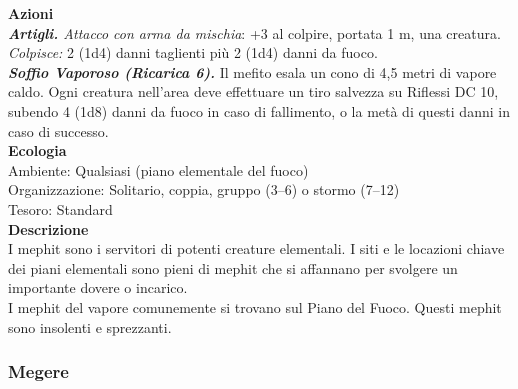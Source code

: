 \begin{multicols}{2}
\smallskip\textbf{Azioni}\\
\emph{\textbf{Artigli.} Attacco con arma da mischia}: +3 al colpire, portata 1 m, una creatura.\\
\emph{Colpisce:} 2 (1d4) danni taglienti più 2 (1d4) danni da fuoco.\\
\emph{\textbf{Soffio Vaporoso (Ricarica 6).}} Il mefito esala un cono di 4,5 metri di vapore caldo. Ogni creatura nell'area deve effettuare un tiro salvezza su Riflessi DC 10, subendo 4 (1d8) danni da fuoco in caso di fallimento, o la metà di questi danni in caso di successo.\\
\textbf{Ecologia}\\
Ambiente: Qualsiasi (piano elementale del fuoco)\\
Organizzazione: Solitario, coppia, gruppo (3–6) o stormo (7–12)\\
Tesoro: Standard\\
\textbf{Descrizione}\\
I mephit sono i servitori di potenti creature elementali. I siti e le locazioni chiave dei piani elementali sono pieni di mephit che si affannano per svolgere un importante dovere o incarico.\\
I mephit del vapore comunemente si trovano sul Piano del Fuoco. Questi mephit sono insolenti e sprezzanti.\\

\subsubsection{Megere}


\end{multicols}
